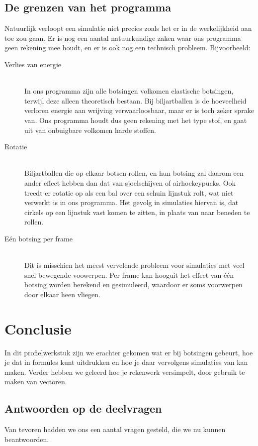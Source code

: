 \documentclass[12pt,a4paper]{article}
\begin{document}
	\subsection{De grenzen van het programma}
	Natuurlijk verloopt een simulatie niet precies zoals het er in de werkelijkheid aan toe zou gaan. Er is nog een aantal natuurkundige zaken waar ons programma geen rekening mee houdt, en er is ook nog een technisch probleem. Bijvoorbeeld:
	\begin{description}
  		\item[Verlies van energie] \hfill \\
  			In ons programma zijn alle botsingen volkomen elastische botsingen, terwijl deze alleen theoretisch bestaan. Bij biljartballen is de hoeveelheid verloren energie aan wrijving verwaarloosbaar, maar er is toch zeker sprake van. Ons programma houdt dus geen rekening met het type stof, en gaat uit van onbuigbare volkomen harde stoffen.
		\item[Rotatie] \hfill \\
			Biljartballen die op elkaar botsen rollen, en hun botsing zal daarom een ander effect hebben dan dat van sjoelschijven of airhockeypucks. Ook treedt er rotatie op als een bal over een schuin lijnstuk rolt, wat niet verwerkt is in ons programma. Het gevolg in simulaties hiervan is, dat cirkels op een lijnstuk vast komen te zitten, in plaats van naar beneden te rollen.
		\item[E\'{e}n botsing per frame] \hfill \\
			Dit is misschien het meest vervelende probleem voor simulaties met veel snel bewegende voowerpen. Per frame kan hooguit het effect van \'{e}\'{e}n botsing worden berekend en gesimuleerd, waardoor er soms voorwerpen door elkaar heen vliegen.
	\end{description}
	
	\newpage

	\section{Conclusie}
	In dit profielwerkstuk zijn we erachter gekomen wat er bij botsingen gebeurt, hoe je dat in formules kunt uitdrukken en hoe je daar vervolgens simulaties van kan maken. Verder hebben we geleerd hoe je rekenwerk versimpelt, door gebruik te maken van vectoren.
	
	\subsection{Antwoorden op de deelvragen}
	Van tevoren hadden we ons een aantal vragen gesteld, die we nu kunnen beantwoorden.
\end{document}
